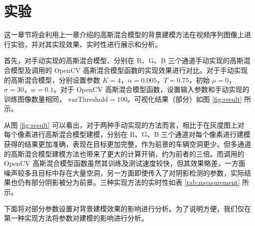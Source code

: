 \section{实验}
\label{sec:experiment}

这一章节将会利用上一章介绍的高斯混合模型的背景建模方法在视频序列图像上进行实验，并对其实现效果、实时性进行展示和分析。

首先，对手动实现的高斯混合模型、分别在 R、G、B 三个通道手动实现的高斯混合模型及调用的 OpenCV 高斯混合模型函数的实现效果进行对比。对于手动实现的高斯混合模型，分别设置参数 $K=4$，$\alpha = 0.005$，$T = 0.75$，初始 $\mu = 0$，$\sigma = 30$，$w = 0.1$。对于 OpenCV 高斯混合模型函数，设置输入参数和手动实现的训练图像数量相同， $\text{varThreshold}=100$。可视化结果（部分）如图 \ref{fig:result} 所示。

从图 \ref{fig:result} 可以看出，对于两种手动实现的方法而言，相比于在灰度图上对每个像素进行高斯混合模型建模，分别在 R、G、B 三个通道对每个像素进行建模获得的结果更加准确，表现在目标更加完整，作为前景的车辆空洞更少。但多通道的高斯混合模型建模方法也带来了更大的计算开销，约为前者的三倍。而调用的 OpenCV 高斯混合模型函数虽然其训练及测试速度较快，但其效果略差，一方面噪声较多且目标中存在大量空洞，另一方面即使传入了对阴影检测的参数，实际结果也仍有部分阴影被分为前景。三种实现方法的实时性如表 \ref{tab:measurement} 所示。

\begin{table}[!htbp]
\caption{不同实现方法的实时性比较}
\centering
\label{tab:measurement}
\end{table}

下面将对部分参数设置对背景建模效果的影响进行分析。为了说明方便，我们仅在第一种实现方法将参数对建模的影响进行分析。


